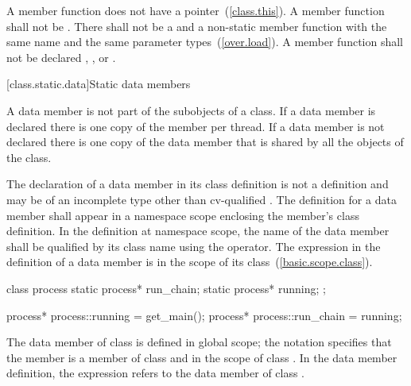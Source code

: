 \pnum
\enternote
A  member function does not have a 
pointer~(\ref{class.this}).
\exitnote
A  member function shall not be . There
shall not be a  and a non-static member function with the
same name and the same parameter types~(\ref{over.load}). A
 member function shall not be declared ,
, or .

[class.static.data]{Static data members}
%

\pnum
A  data member is not part of the subobjects of a class. If a
 data member is declared  there is one copy of
the member per thread. If a  data member is not declared
 there is one copy of the data member that is shared by all
the objects of the class.

\pnum
{}%
%
The declaration of a  data member in its class definition
is not a definition and may be of an incomplete type other than
cv-qualified . The definition for a  data
member shall appear in a namespace scope enclosing the member's class
definition.
%
In the definition at namespace scope, the name of the 
data member shall be qualified by its class name using the \tcode{::}
operator. The  expression in the definition of a
 data member is in the scope of its
class~(\ref{basic.scope.class}).
%
\enterexample

\begin{codeblock}
class process {
  static process* run_chain;
  static process* running;
};

process* process::running = get_main();
process* process::run_chain = running;
\end{codeblock}

The  data member  of class
 is defined in global scope; the notation
 specifies that the member 
is a member of class  and in the scope of class
. In the  data member definition, the
 expression refers to the  data
member  of class .
\exitexample


